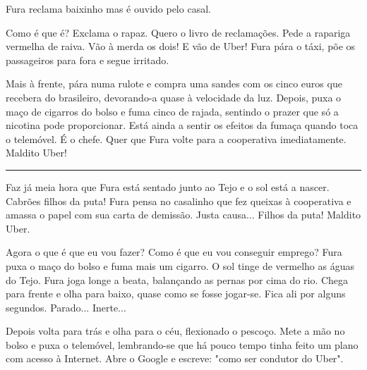 \documentclass[12pt]{creativeWriting}
\begin{document}
 Fura reclama baixinho mas é ouvido pelo casal.

Como é que é? Exclama o rapaz. Quero o livro de reclamações. Pede a rapariga vermelha de raiva. Vão à merda os dois! E vão de Uber! Fura pára o táxi, põe os passageiros para fora e segue irritado.

Mais à frente, pára numa rulote e compra uma sandes com os cinco euros que recebera do brasileiro, devorando-a quase à velocidade da luz. Depois, puxa o maço de cigarros do bolso e fuma cinco de rajada, sentindo o prazer que só a nicotina pode proporcionar. Está ainda a sentir os efeitos da fumaça quando toca o telemóvel. É o chefe. Quer que Fura volte para a cooperativa imediatamente. Maldito Uber!

\rule[0.5ex]{\linewidth}{1pt}

Faz já meia hora que Fura está sentado junto ao Tejo e o sol está a nascer. Cabrões filhos da puta! Fura pensa no casalinho que fez queixas à cooperativa e amassa o papel com sua carta de demissão. Justa causa... Filhos da puta! Maldito Uber.

Agora o que é que eu vou fazer? Como é que eu vou conseguir emprego? Fura puxa o maço do bolso e fuma mais um cigarro. O sol tinge de vermelho as águas do Tejo. Fura joga longe a beata, balançando as pernas por cima do rio. Chega para frente e olha para baixo, quase como se fosse jogar-se. Fica ali por alguns segundos. Parado... Inerte...

Depois volta para trás e olha para o céu, flexionado o pescoço. Mete a mão no bolso e puxa o telemóvel, lembrando-se que há pouco tempo tinha feito um plano com acesso à Internet. Abre o Google e escreve: "como ser condutor do Uber".
\end{document}
